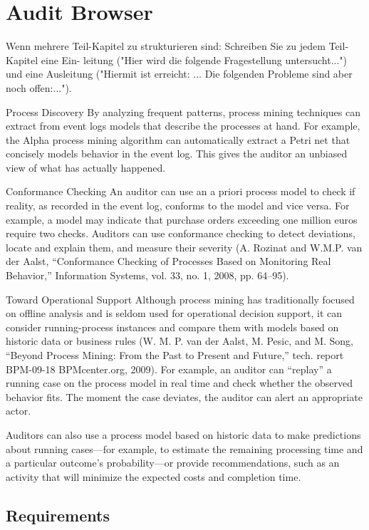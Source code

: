 %
\chapter{Audit Browser}\label{chap:ab}

Wenn mehrere Teil-Kapitel zu strukturieren sind: Schreiben Sie zu jedem Teil-Kapitel eine Ein- leitung ("Hier wird die folgende Fragestellung untersucht...") und eine Ausleitung ("Hiermit ist erreicht: ... Die folgenden Probleme sind aber noch offen:...").

Process Discovery \citep{5427384}
By analyzing frequent patterns, process mining techniques can extract from event logs models that describe the processes at hand. For example, the Alpha process mining algorithm can automatically extract a Petri net that concisely models behavior in the event log. This gives the auditor an unbiased view of what has actually happened.

Conformance Checking
An auditor can use an a priori process model to check if reality, as recorded in the event log, conforms to the model and vice versa. For example, a model may indicate that purchase orders exceeding one million euros require two checks. Auditors can use conformance checking to detect deviations, locate and explain them, and measure their severity (A. Rozinat and W.M.P. van der Aalst, “Conformance Checking of Processes Based on Monitoring Real Behavior,” Information Systems, vol. 33, no. 1, 2008, pp. 64–95).

Toward Operational Support
Although process mining has traditionally focused on offline analysis and is seldom used for operational decision support, it can consider running-process instances and compare them with models based on historic data or business rules (W. M. P. van der Aalst, M. Pesic, and M. Song, “Beyond Process Mining: From the Past to Present and Future,” tech. report BPM-09-18 BPMcenter.org, 2009). For example, an auditor can “replay” a running case on the process model in real time and check whether the observed behavior fits. The moment the case deviates, the auditor can alert an appropriate actor.

Auditors can also use a process model based on historic data to make predictions about running cases—for example, to estimate the remaining processing time and a particular outcome's probability—or provide recommendations, such as an activity that will minimize the expected costs and completion time.

\section{Requirements}

